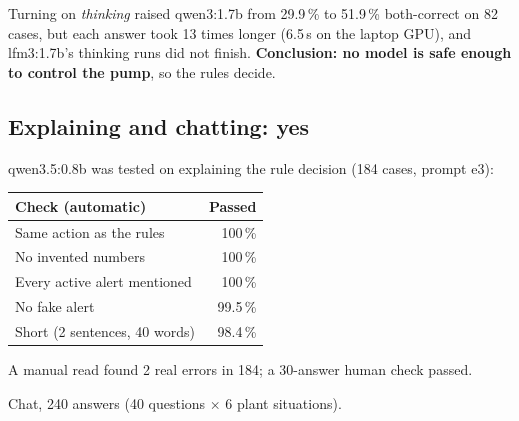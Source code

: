 \documentclass[10pt,a4paper]{article}
\begin{document}
Turning on \emph{thinking} raised qwen3:1.7b from 29.9\,\% to 51.9\,\% both-correct on 82 cases,
but each answer took 13 times longer (6.5\,s on the laptop GPU), and lfm3:1.7b's thinking runs did not
finish. \textbf{Conclusion: no model is safe enough to control the pump}, so the rules decide.

\subsection{Explaining and chatting: yes}

\begin{minipage}[t]{0.52\textwidth}
\vspace{0pt}
qwen3.5:0.8b was tested on explaining the rule decision (184 cases, prompt e3):

\small
\begin{tabularx}{\linewidth}{@{}Xr@{}}
\toprule
Check (automatic) & Passed \\
\midrule
Same action as the rules & 100\,\% \\
No invented numbers & 100\,\% \\
Every active alert mentioned & 100\,\% \\
No fake alert & 99.5\,\% \\
Short (2 sentences, 40 words) & 98.4\,\% \\
\bottomrule
\end{tabularx}\par
\normalsize
A manual read found 2 real errors in 184; a 30-answer human check passed.
\end{minipage}\hfill
\begin{minipage}[t]{0.44\textwidth}
\vspace{0pt}
\centering
{}\par
\footnotesize\color{muted} Chat, 240 answers (40 questions $\times$ 6 plant situations).
\end{minipage}
\end{document}
